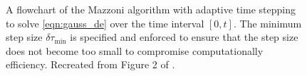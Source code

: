 \begin{figure}
\begin{center}
		\caption{A flowchart of the Mazzoni algorithm with adaptive time stepping to solve \cref{eqn:gauss_de} over the time interval \([0,t]\).
			The minimum step size \(\delta \tau_{\mathrm{min}}\) is specified and enforced to ensure that the step size does not become too small to compromise computationally efficiency.
			Recreated from Figure 2 of \citet{Mazzoni_2008_ComputationalAspectsContinuous}.}
		\label{fig:mazzoni_alg}
	\end{center}
\end{figure}

